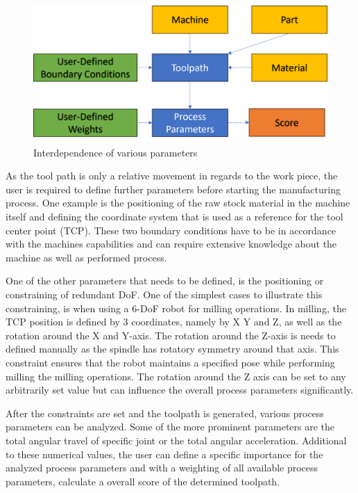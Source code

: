 \begin{figure}[H]
	\centerline{\includegraphics[scale=.6]{figures/BasicScore.png}}
	\caption{Interdependence of various parameters}
	\label{BasicScore}
\end{figure}

As the tool path is only a relative movement in regards to the work piece, the user is required to define further parameters before starting the manufacturing process. One example is the positioning of the raw stock material in the machine itself and defining the coordinate system that is used as a reference for the tool center point (TCP). These two boundary conditions have to be in accordance with the machines capabilities and can require extensive knowledge about the machine as well as performed process.

One of the other parameters that needs to be defined, is the positioning or constraining of redundant DoF. One of the simplest cases to illustrate this constraining, is when using a 6-DoF robot for milling operations. In milling, the TCP position is defined by 3 coordinates, namely by X Y and Z, as well as the rotation around the X and Y-axis. The rotation around the Z-axis is needs to defined manually as the spindle has rotatory symmetry around that axis. This constraint ensures that the robot maintains a specified pose while performing milling the milling operations. The rotation around the Z axis can be set to any arbitrarily set value but can influence the overall process parameters significantly. 

After the constraints are set and the toolpath is generated, various process parameters can be analyzed. Some of the more prominent parameters are the total angular travel of specific joint or the total angular acceleration. Additional to these numerical values, the user can define a specific importance for the analyzed process parameters and with a weighting of all available process parameters, calculate a overall score of the determined toolpath.


